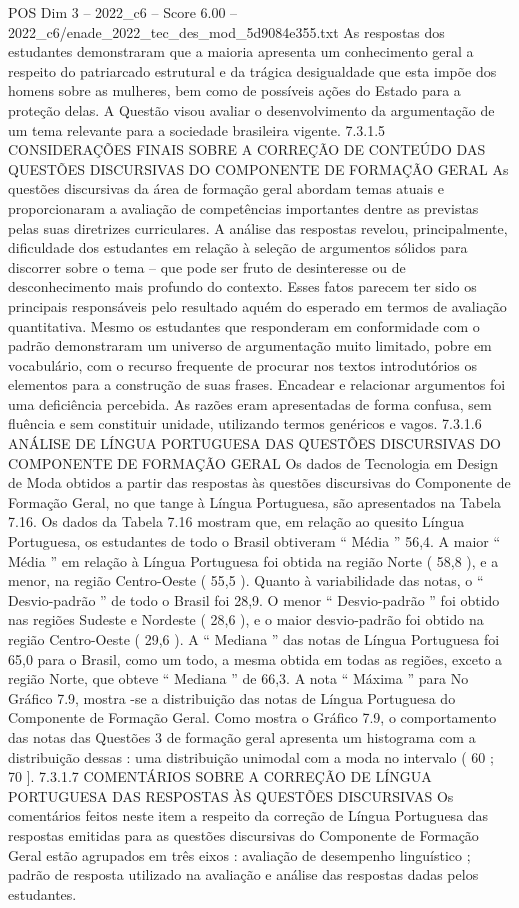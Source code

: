 \begin{textsample}{POS Dim 3 – 2022\_c6 – Score 6.00 – 2022\_c6/enade\_2022\_tec\_des\_mod\_5d9084e355.txt}
As respostas dos estudantes demonstraram que a maioria apresenta um conhecimento geral a respeito do patriarcado estrutural e da trágica desigualdade que esta impõe dos homens sobre as mulheres, bem como de possíveis ações do Estado para a proteção delas.
A Questão visou avaliar o desenvolvimento da argumentação de um tema relevante para a sociedade brasileira vigente. 7.3.1.5 CONSIDERAÇÕES FINAIS SOBRE A CORREÇÃO DE CONTEÚDO DAS QUESTÕES DISCURSIVAS DO COMPONENTE DE FORMAÇÃO GERAL As questões discursivas da área de formação geral abordam temas atuais e proporcionaram a avaliação de competências importantes dentre as previstas pelas suas diretrizes curriculares.
A análise das respostas revelou, principalmente, dificuldade dos estudantes em relação à seleção de argumentos sólidos para discorrer sobre o tema – que pode ser fruto de desinteresse ou de desconhecimento mais profundo do contexto.
Esses fatos parecem ter sido os principais responsáveis pelo resultado aquém do esperado em termos de avaliação quantitativa.
Mesmo os estudantes que responderam em conformidade com o padrão demonstraram um universo de argumentação muito limitado, pobre em vocabulário, com o recurso frequente de procurar nos textos introdutórios os elementos para a construção de suas frases.
Encadear e relacionar argumentos foi uma deficiência percebida.
As razões eram apresentadas de forma confusa, sem fluência e sem constituir unidade, utilizando termos genéricos e vagos. 7.3.1.6 ANÁLISE DE LÍNGUA PORTUGUESA DAS QUESTÕES DISCURSIVAS DO COMPONENTE DE FORMAÇÃO GERAL Os dados de Tecnologia em Design de Moda obtidos a partir das respostas às questões discursivas do Componente de Formação Geral, no que tange à Língua Portuguesa, são apresentados na Tabela 7.16.
Os dados da Tabela 7.16 mostram que, em relação ao quesito Língua Portuguesa, os estudantes de todo o Brasil obtiveram “ Média ” 56,4.
A maior “ Média ” em relação à Língua Portuguesa foi obtida na região Norte ( 58,8 ), e a menor, na região Centro-Oeste ( 55,5 ).
Quanto à variabilidade das notas, o “ Desvio-padrão ” de todo o Brasil foi 28,9.
O menor “ Desvio-padrão ” foi obtido nas regiões Sudeste e Nordeste ( 28,6 ), e o maior desvio-padrão foi obtido na região Centro-Oeste ( 29,6 ).
A “ Mediana ” das notas de Língua Portuguesa foi 65,0 para o Brasil, como um todo, a mesma obtida em todas as regiões, exceto a região Norte, que obteve “ Mediana ” de 66,3.
A nota “ Máxima ” para No Gráfico 7.9, mostra -se a distribuição das notas de Língua Portuguesa do Componente de Formação Geral.
Como mostra o Gráfico 7.9, o comportamento das notas das Questões 3 de formação geral apresenta um histograma com a distribuição dessas : uma distribuição unimodal com a moda no intervalo ( 60 ; 70 ]. 7.3.1.7 COMENTÁRIOS SOBRE A CORREÇÃO DE LÍNGUA PORTUGUESA DAS RESPOSTAS ÀS QUESTÕES DISCURSIVAS Os comentários feitos neste item a respeito da correção de Língua Portuguesa das respostas emitidas para as questões discursivas do Componente de Formação Geral estão agrupados em três eixos : avaliação de desempenho linguístico ; padrão de resposta utilizado na avaliação e análise das respostas dadas pelos estudantes.

\end{textsample}
